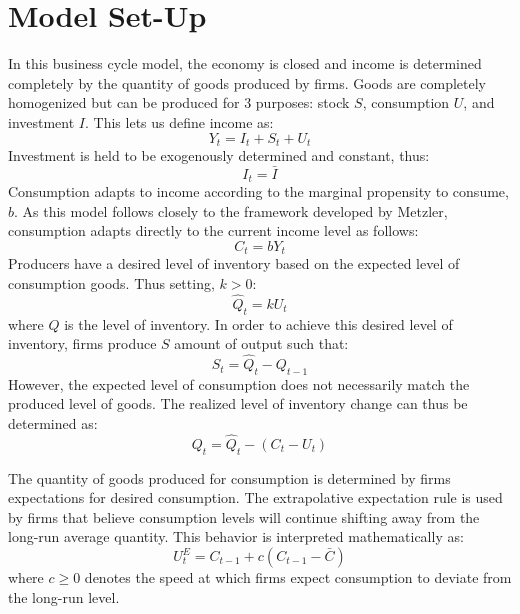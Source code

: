 \section{Model Set-Up}
In this business cycle model, the economy is closed and income is determined completely by the quantity of goods produced by firms. Goods are completely homogenized but can be produced for 3 purposes: stock $S$, consumption $U$, and investment $I$. This lets us define income as:
\begin{equation}
    Y_t=I_t+S_t+U_t
\end{equation}
Investment is held to be exogenously determined and constant, thus:
\begin{equation}
    I_t=\bar I
\end{equation}
Consumption adapts to income according to the marginal propensity to consume, $b$. As this model follows closely to the framework developed by Metzler\autocite{Metzler1941}, consumption adapts directly to the current income level as follows:
\begin{equation}
    C_t=bY_t
\end{equation}
Producers have a desired level of inventory based on the expected level of consumption goods. Thus setting, $k>0$:
\begin{equation}
    \hat Q_t=kU_t
\end{equation}  
where $Q$ is the level of inventory. In order to achieve this desired level of inventory, firms produce $S$ amount of output such that:
\begin{equation}
    S_t=\hat Q_t-Q_{t-1}
\end{equation}
However, the expected level of consumption does not necessarily match the produced level of goods. The realized level of inventory change can thus be determined as:
\begin{equation}
    Q_t=\hat Q_t-(C_t-U_t)
\end{equation}

The quantity of goods produced for consumption is determined by firms expectations for desired consumption. The extrapolative expectation rule is used by firms that believe consumption levels will continue shifting away from the long-run average quantity. This behavior is interpreted mathematically as:
\begin{equation}
    U^E_t=C_{t-1}+c(C_{t-1}-\bar C)
\end{equation}
where $c\geq 0$ denotes the speed at which firms expect consumption to deviate from the long-run level. 


